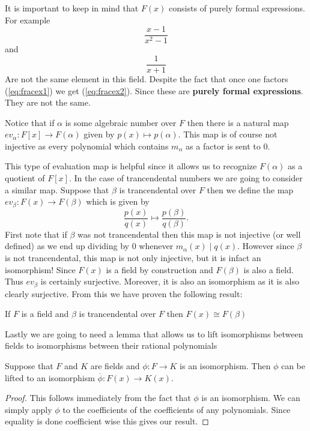 \begin{remark}
  It is important to keep in mind that $F(x)$ consists of purely formal
  expressions. For example
  \begin{equation}\label{eq:fracex1}
    \frac{x-1}{x^2 - 1}
  \end{equation}
  and
  \begin{equation}\label{eq:fracex2}
  \frac{1}{x + 1}
  \end{equation}
  Are not the same element in this field. Despite the fact that once one
  factors (\ref{eq:fracex1}) we get (\ref{eq:fracex2}). Since these
  are \textbf{purely formal expressions}. They are not the same.
\end{remark}

Notice that if $\alpha$ is some algebraic number over $F$ then there is
a natural map $ev_{\alpha}: F[x] \to F(\alpha)$ given by $p(x) \mapsto
p(\alpha)$. This map is of course not injective as every polynomial which
contains $m_{\alpha}$ as a factor is sent to 0. 

This type of evaluation map is helpful since it allows us to recognize
$F(\alpha)$ as a quotient of $F[x]$. In the case of trancendental numbers we
are going to consider a similar map. Suppose that $\beta$ is trancendental over
$F$ then we define the map $ev_{\beta}: F(x) \to F(\beta)$ which is given by 
\[
  \frac{p(x)}{q(x)} \mapsto \frac{p(\beta)}{q(\beta)}
.\] 
First note that if $\beta$ was not trancendental then this map is not injective
(or well defined) as we end up dividing by 0 whenever $m_{\alpha}(x) \mid
q(x)$. However since $\beta$ is not trancendental, this map is not only
injective, but it is infact an isomorphism! Since $F(x)$ is a field by
construction and $F(\beta)$ is also a field. Thus $ev_{\beta}$ is certainly
surjective. Moreover, it is also an isomorphism as it is also clearly
surjective. From this we have proven the following result:

\begin{lemma}\label{lemma:isotoquot}
  If $F$ is a field and $\beta$ is trancendental over $F$ then $F(x) \cong
  F(\beta)$ 
\end{lemma}

Lastly we are going to need a lemma that allows us to lift isomorphisms between
fields to isomorphisms between their rational polynomials

\begin{lemma}\label{lemma:lifttoquot}
 Suppose that $F$ and $K$ are fields and $\phi: F \to K$ is an isomorphism.
 Then $\phi$ can be lifted to an isomorphism $\overline{\phi}: F(x) \to K(x)$. 
\end{lemma}
\begin{proof}
  This follows immediately from the fact that $\phi$ is an isomorphism. We can
  simply apply $\phi$ to the coefficients of the coefficients of any
  polynomials. Since equality is done coefficient wise this gives our result.
\end{proof}

